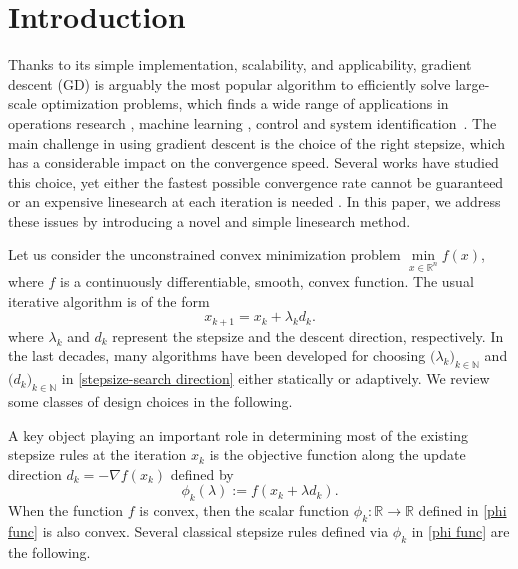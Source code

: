 \documentclass[11pt, a4paper, oneside, reqno]{amsart}
\begin{document}

\section{Introduction}\label{intro}
Thanks to its simple implementation, scalability, and applicability, gradient descent (GD) is arguably the most popular algorithm to efficiently solve large-scale optimization problems, which finds a wide range of applications in operations research \cite{im2025stochastic, xu2021first, ho2018online}, machine learning \cite{Battiti1992, lan2020first}, control and system identification~\cite{hardt2018gradient, fazel2013hankel}. The main challenge in using gradient descent is the choice of the right stepsize, which has a considerable impact on the convergence speed. Several works have studied this choice, yet either the fastest possible convergence rate cannot be guaranteed or an expensive linesearch at each iteration is needed \cite{Polyak1969, Malitsky2020, Nocedal2006, Drori2014}. In this paper, we address these issues by introducing a novel and simple linesearch method.

Let us consider the unconstrained convex minimization problem $\min\limits_{x \in \mathbb{R}^n} f(x)$, {where $f$ is a continuously differentiable, smooth, convex function}. The usual iterative algorithm is of the form
\begin{equation}\label{stepsize-search direction}
    x_{k+1} = x_k + \lambda_k d_k. %
\end{equation}
where $\lambda_k$ and $d_k$ represent the stepsize and the descent direction, respectively. In the last decades, many algorithms have been developed for choosing $\bigl( \lambda_k \bigr)_{k\in \mathbb{N}}$ and $\bigl( d_k \bigr)_{k\in \mathbb{N}}$ in \eqref{stepsize-search direction} either statically or adaptively. We review some classes of design choices in the following.

A key object playing an important role in determining most of the existing stepsize rules at the iteration $x_k$ is the objective function along the update direction $d_k = -\nabla f(x_k)$ defined by
\begin{equation}\label{phi func}
    \phi_k (\lambda) := f(x_k +\lambda d_k).
\end{equation}
When the function $f$ is convex, then the scalar function $\phi_k: \mathbb{R} \rightarrow \mathbb{R}$ defined in \eqref{phi func} is also convex. Several classical stepsize rules defined via $\phi_k$ in \eqref{phi func} are the following. 
\end{document}
